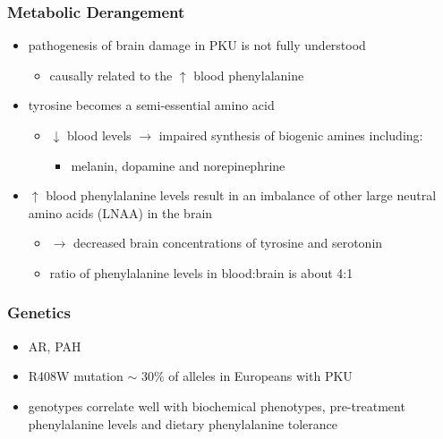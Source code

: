 \documentclass{scrartcl}
\begin{document}
\subsubsection{Metabolic Derangement}
\label{sec:org7907064}
\begin{itemize}
\item pathogenesis of brain damage in PKU is not fully understood
\begin{itemize}
\item causally related to the \(\uparrow\) blood phenylalanine
\end{itemize}
\item tyrosine becomes a semi-essential amino acid
\begin{itemize}
\item \(\downarrow\) blood levels \(\to\) impaired synthesis of biogenic amines including:
\begin{itemize}
\item melanin, dopamine and norepinephrine
\end{itemize}
\end{itemize}
\item \(\uparrow\) blood phenylalanine levels result in an imbalance of other large
neutral amino acids (LNAA) in the brain
\begin{itemize}
\item \(\to\) decreased brain concentrations of tyrosine and serotonin
\item ratio of phenylalanine levels in blood:brain is about 4:1
\end{itemize}
\end{itemize}

\subsubsection{Genetics}
\label{sec:orgf3a26f1}
\begin{itemize}
\item AR, PAH
\item R408W mutation \(\sim\) 30\% of alleles in Europeans with PKU
\item genotypes correlate well with biochemical phenotypes, pre-treatment
phenylalanine levels and dietary phenylalanine tolerance
\end{itemize}
\end{document}
